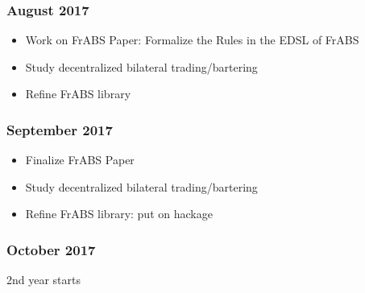 \subsubsection{August 2017}
\begin{itemize}
	\item Work on FrABS Paper: Formalize the Rules in the EDSL of FrABS
	\item Study decentralized bilateral trading/bartering
	\item Refine FrABS library
\end{itemize}

\subsubsection{September 2017}
\begin{itemize}
	\item Finalize FrABS Paper
	\item Study decentralized bilateral trading/bartering
	\item Refine FrABS library: put on hackage
\end{itemize}

\subsubsection{October 2017}
2nd year starts
